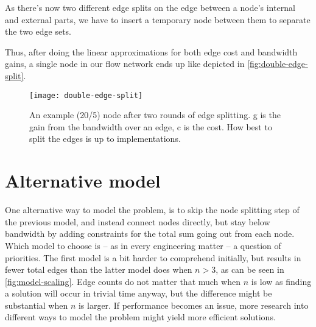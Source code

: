 As there's now two different edge splits on the edge between a node's internal and external parts, we have to insert a temporary node between them to separate the two edge sets.

Thus, after doing the linear approximations for both edge cost and bandwidth gains, a single node in our flow network ends up like depicted in \autoref{fig:double-edge-split}.

\begin{figure}
    \centering
    \texttt{[image: double-edge-split]}
    \caption{An example (20/5) node after two rounds of edge splitting. g is the gain from the bandwidth over an edge, c is the cost. How best to split the edges is up to implementations.}
    \label{fig:double-edge-split}
\end{figure}


\section{Alternative model}\label{sec:alternative-model}

One alternative way to model the problem, is to skip the node splitting step of the previous model, and instead connect nodes directly, but stay below bandwidth by adding constraints for the total sum going out from each node. Which model to choose is -- as in every engineering matter -- a question of priorities. The first model is a bit harder to comprehend initially, but results in fewer total edges than the latter model does when $n>3$, as can be seen in \autoref{fig:model-scaling}. Edge counts do not matter that much when $n$ is low as finding a solution will occur in trivial time anyway, but the difference might be substantial when $n$ is larger. If performance becomes an issue, more research into different ways to model the problem might yield more efficient solutions.


